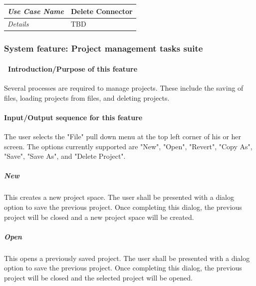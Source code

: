 \documentclass[twoside,letterpaper]{article}
\begin{document}
\begin{flushleft}
\tablehead{}
\begin{tabular}{|m{2.0in} m{5.0in}|}
\hline {\bfseries\emph{Use Case Name}}
& {\bfseries Delete Connector}
\\\hline
\emph{Details}
& TBD
\\\hline
\end{tabular}
\end{flushleft}
\bigskip


\clearpage






\clearpage


\subsubsection[System feature: [Project management tasks suite]{\rmfamily\bfseries System
feature: Project management tasks suite}

\paragraph[\ Introduction/Purpose of this feature]{\foreignlanguage{english}{\ }\foreignlanguage{english}{Introduction/Purpose of this feature}}
{
Several processes are required to manage projects. These include the saving of files, loading projects from files, and deleting projects.}


\paragraph[Input/Output sequence for this feature]{\rmfamily\bfseries
Input/Output sequence for this feature}
{
The user selects the "File" pull down menu at the top left corner of his or her screen. The options currently supported are "New", "Open", "Revert", "Copy As", "Save", "Save As", and "Delete Project". }

\subparagraph{New}
{
This creates a new project space. The user shall be presented with a dialog option to save the previous project. Once completing this dialog, the previous project will be closed and a new project space will be created. }

\subparagraph{Open}
{
This opens a previously saved project. The user shall be presented with a dialog option to save the previous project. Once completing this dialog, the previous project will be closed and the selected project will be opened.}
\end{document}
